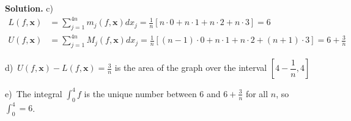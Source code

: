 \documentclass[12pt]{article}
\theoremstyle{definition}
\theoremstyle{remark}
\theoremstyle{definition}
\newenvironment{Solution}{\noindent\textbf{Solution.}}{}
\newcommand{\bx}{\mathbf x}
\begin{document}
\begin{Solution}
c)\
\[\begin{split}
L(f,\bx)&=\sum_{j=1}^{4n}m_j(f,\bx)dx_j=\frac{1}{n}\left[
n\cdot 0+n\cdot 1+n\cdot 2+n\cdot 3\right]=6\\
U(f,\bx)&=\sum_{j=1}^{4n}M_j(f,\bx)dx_j=\frac{1}{n}\left[
(n-1)\cdot 0+n\cdot 1+n\cdot 2+(n+1)\cdot 3\right]=6+\frac{3}{n}
\end{split}
\]

d)\ $U(f,\bx)-L(f,\bx)=\frac{3}{n}$ is the area of the graph over the interval 
$[4-\dfrac{1}{n},4]$

e)\ The integral $\int_0^4f $ is the unique number between $6$ and $6+\frac{3}{n}$ for all $n$, so $\int_0^4=6$. 
\end{Solution}
\end{document}
